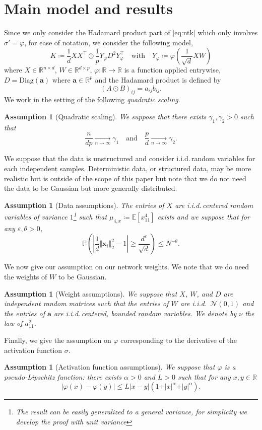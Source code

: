 \documentclass[letterpaper, 10pt, dvipsnames]{article}
\numberwithin{equation}{section}
\newcommand{\Rbb}{\mathbb{R}}
\newcommand{\x}{\mathbf{x}}
\renewcommand{\phi}{\varphi}
\renewcommand{\P}{\mathds{P}}
\newcommand{\E}{\mathds{E}}
\newtheorem{ass}[ccounter]{Assumption}
\theoremstyle{definition}
\begin{document}
\section{Main model and results}

Since we only consider the Hadamard product part of \eqref{eq:ntk} which only involves $\sigma'=\phi$, for ease of notation, we consider the following model, 
\[
K \coloneqq \frac{1}{d}XX^\top \odot \frac{1}{p}Y_\phi D^2 Y_\phi^\top \quad\text{with}\quad Y_\phi\coloneqq \phi\left(\frac{1}{\sqrt{d}}XW\right)   
\]
where $X\in\Rbb^{n\times d}$, $W\in\Rbb^{d\times p}$, $\phi:\Rbb\to\Rbb$ is a function applied entrywise, $D=\mathrm{Diag}(\mathbf{a})$ where $\mathbf{a}\in\Rbb^p$ and the Hadamard product is defined by 
\[
(A\odot B)_{ij}=a_{ij}b_{ij}.    
\] 
We work in the setting of the following \emph{quadratic scaling}.
\begin{ass}[Quadratic scaling]
We suppose that there exists $\gamma_1,\gamma_2>0$ such that 
\[
\frac{n}{dp}\xrightarrow[n\to\infty]{}\gamma_1\quad \text{and} \quad\frac{p}{d}\xrightarrow[n\to\infty]{}\gamma_2.
\]
\end{ass}
We suppose that the data is unstructured and consider i.i.d.\,random variables for each independent samples. Deterministic data, or structured data, may be more realistic but is outside of the scope of this paper but note that we do not need the data to be Gaussian but more generally distributed.
\begin{ass}[Data assumptions]
The entries of $X$ are i.i.d.\,centered random variables of variance $1$\footnote{The result can be easily generalized to a general variance, for simplicity we develop the proof with unit variance} such that $\mu_{4,x}\coloneqq\E[x_{11}^4]$ exists and we suppose that for any $\varepsilon,\theta>0$,
\begin{equation}\label{eq:conchi2}
      \P\left(  
        \left\vert \frac{1}{d}\Vert \x_i\Vert_2^2-1\right\vert
        \geqslant \frac{d^\varepsilon}{\sqrt{d}}
        \right)
        \leqslant N^{-\theta}.
    \end{equation} 
\end{ass} 

We now give our assumption on our network weights. We note that we do need the weights of $W$ to be Gaussian.
\begin{ass}[Weight assumptions] 
  We suppose that $X$, $W$, and $D$ are independent random matrices such that the entries of $W$ are i.i.d.\ $\mathcal{N}(0,1)$ and the entries of $\mathbf{a}$ are i.i.d.\,centered, bounded random variables.  We denote by $\nu$ the law of $a_{11}^2$.
\end{ass}
Finally, we give the assumption on $\phi$ corresponding to the derivative of the activation function $\sigma$.
\begin{ass}[Activation function assumptions]
    We suppose that $\phi$ is a pseudo-Lipschitz function: there exists $\alpha>0$ and $L>0$ such that for any $x,y\in\Rbb$
    \[
      \left\vert
        \phi(x)-\phi(y)
      \right\vert
      \leqslant 
      L\vert x-y\vert \left(
        1+\vert x\vert^\alpha+\vert y\vert^\alpha
      \right).
    \]
\end{ass}
\end{document}
